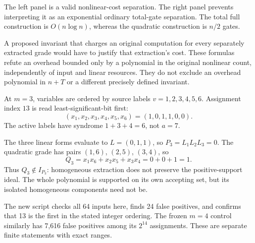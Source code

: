 
The left panel is a valid nonlinear-cost separation. The right panel
prevents interpreting it as an exponential ordinary total-gate separation.
The total full construction is $O(n\log n)$, whereas the quadratic
construction is $n/2$ gates.

A proposed invariant that charges an original computation for every
separately extracted grade would have to justify that extraction's cost.
These formulas refute an overhead bounded only by a polynomial in the
original nonlinear count, independently of input and linear resources.
They do not exclude an overhead polynomial in $n+T$ or a different
precisely defined invariant.


At $m=3$, variables are ordered by source labels $v=1,2,3,4,5,6$.
Assignment index $13$ is read least-significant-bit first:
\[
 (x_1,x_2,x_3,x_4,x_5,x_6)=(1,0,1,1,0,0).
\]
The active labels have syndrome $1+3+4=6$, not $a=7$.


The three linear forms evaluate to $L=(0,1,1)$, so $P_3=L_1L_2L_3=0$.
The quadratic grade has pairs $(1,6)$, $(2,5)$, $(3,4)$, so
\[
 Q_3=x_1x_6+x_2x_5+x_3x_4=0+0+1=1.
\]
Thus $Q_3\notin I_{P_3}$: homogeneous extraction does not preserve the
positive-support ideal. The whole polynomial is supported on its own
accepting set, but its isolated homogeneous components need not be.

The new script checks all 64 inputs here, finds 24 false positives, and
confirms that 13 is the first in the stated integer ordering. The frozen
$m=4$ control similarly has 7,616 false positives among its $2^{14}$
assignments. These are separate finite statements with exact ranges.



